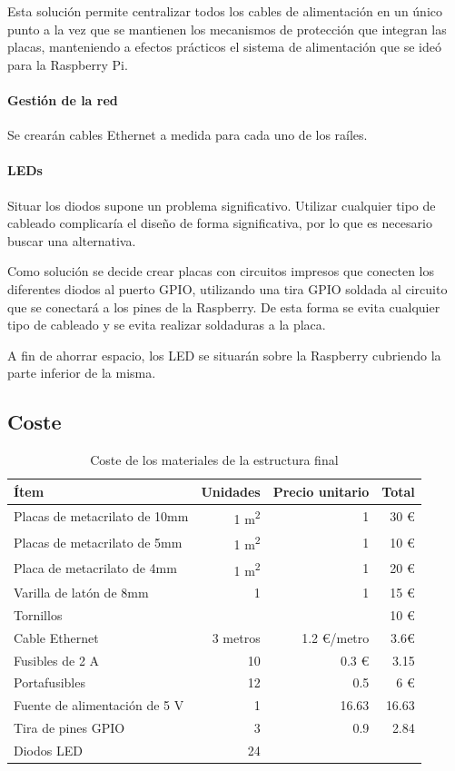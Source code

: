 Esta solución permite centralizar todos los cables de alimentación en un único punto a la vez que se mantienen los mecanismos de protección que integran las placas, manteniendo a efectos prácticos el sistema de alimentación que se ideó para la Raspberry Pi.

\paragraph{Gestión de la red\\}

Se crearán cables Ethernet a medida para cada uno de los raíles.

\paragraph{LEDs}

Situar los diodos supone un problema significativo. Utilizar cualquier tipo de cableado complicaría el diseño de forma significativa, por lo que es necesario buscar una alternativa.

Como solución se decide crear placas con circuitos impresos que conecten los diferentes diodos al puerto GPIO, utilizando una tira GPIO soldada al circuito que se conectará a los pines de la Raspberry. De esta forma se evita cualquier tipo de cableado y se evita realizar soldaduras a la placa.

A fin de ahorrar espacio, los LED se situarán sobre la Raspberry cubriendo la parte inferior de la misma.

\subsection{Coste}

\begin{table}[H]
\centering
\begin{tabular}{|l|r|r|r|}
\hline
\textbf{Ítem} & \textbf{Unidades} & \textbf{Precio unitario} & \textbf{Total} \\ \hline
Placas de metacrilato de 10mm & 1 m\textsuperscript{2} & 1 & 30 € \\ \hline
Placas de metacrilato de 5mm & 1 m\textsuperscript{2} & 1 & 10 € \\ \hline
Placa de metacrilato de 4mm & 1 m\textsuperscript{2} & 1 & 20 € \\ \hline
Varilla de latón de 8mm & 1 & 1& 15 €\\ \hline
Tornillos & & & 10 €\\ \hline
Cable Ethernet & 3 metros & 1.2 €/metro & 3.6€\\ \hline
Fusibles de 2 A & 10 & 0.3 € & 3.15\\ \hline
Portafusibles & 12 & 0.5 & 6 € \\ \hline
Fuente de alimentación de 5 V & 1 & 16.63 & 16.63 \\ \hline
Tira de pines GPIO & 3 & 0.9 & 2.84 \\ \hline
Diodos LED & 24 & &\\ \hline
\end{tabular}
\caption{Coste de los materiales de la estructura final}
\end{table}


